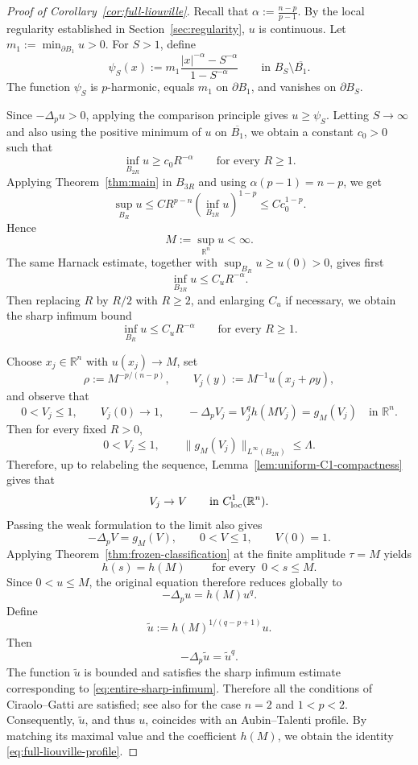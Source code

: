 \documentclass[reqno,12pt]{amsart}
\numberwithin{equation}{section}
\theoremstyle{remark}
\newcommand{\R}{\mathbb R}
\begin{document}
\begin{proof}[Proof of Corollary~\ref{cor:full-liouville}]
Recall that $ \alpha:=\frac{n-p}{p-1}.$
By the local regularity established in
Section~\ref{sec:regularity}, $u$ is continuous.  Let
$m_1:=\min_{\partial B_1}u>0$.  For $S>1$, define
$$
 \psi_S(x):=
 m_1\frac{|x|^{-\alpha}-S^{-\alpha}}{1-S^{-\alpha}}
 \qquad\text{in }B_S\setminus\overline{B_1}.
$$
The function $\psi_S$ is $p$-harmonic, equals $m_1$ on $\partial B_1$, and vanishes on $\partial B_S$.  

Since $-\Delta_p u>0$, applying the comparison principle gives
$u\ge\psi_S$.  Letting $S\to\infty$ and also using the positive minimum of $u$ on $\overline{B_1}$, we obtain a constant $c_0>0$ such that
\begin{equation}\label{eq:entire-lower-bound}
 \inf_{B_{2R}}u\ge c_0R^{-\alpha}  \qquad\text{for every }R\ge1.
\end{equation}
Applying Theorem~\ref{thm:main} in $B_{3R}$ and using
$\alpha(p-1)=n-p$, we get
$$
 \sup_{B_R}u \le C R^{p-n}\left(\inf_{B_{2R}}u\right)^{1-p}
 \le Cc_0^{1-p}.
$$
Hence
$$
 M:=\sup_{\R^n}u<\infty.
$$
The same Harnack estimate, together with $\sup_{B_R}u\ge u(0)>0$, gives first
$$
\inf_{B_{2R}}u\le C_uR^{-\alpha}.
$$
Then replacing $R$ by $R/2$ with $R\ge2$, and enlarging $C_u$ if necessary, we obtain the sharp infimum bound  
\begin{equation}\label{eq:entire-sharp-infimum}
 \inf_{B_R}u\le C_u R^{-\alpha}  \qquad\text{for every }R\ge1.
\end{equation}

Choose $x_j\in\R^n$ with $u(x_j)\to M$, set
$$
 \rho:=M^{-p/(n-p)}, \qquad V_j(y):=M^{-1}u(x_j+\rho y),
$$
and observe that
$$
 0<V_j\le1,  \qquad V_j(0)\to1,
 \qquad  -\Delta_pV_j=V_j^qh(MV_j)=g_M(V_j)
 \quad\text{in }\R^n.
 $$
Then for every fixed $R>0$,
$$
0<V_j\le1, \qquad \|g_M(V_j)\|_{L^\infty(B_{2R})}\le\Lambda.
$$
Therefore, up to relabeling the sequence,  Lemma~\ref{lem:uniform-C1-compactness}  
gives that
$$
V_j\to V\qquad\text{in }C^1_{\rm loc}(\R^n).
$$
Passing the weak formulation to the limit also gives
$$
-\Delta_pV=g_M(V), \qquad 0<V\le1, \qquad V(0)=1. 
$$  Applying
Theorem~\ref{thm:frozen-classification} at the finite amplitude $\tau=M$ yields
$$
 h(s)=h(M)\qquad \text{ for every } \ 0<s\le M.
$$
Since $0<u\le M$, the original equation therefore reduces globally to
$$
 -\Delta_pu=h(M)u^q.
$$
Define
$$
\widetilde u:=h(M)^{1/(q-p+1)}u.
$$
Then
$$
-\Delta_p\widetilde u=\widetilde u^q.
$$ 
The function $\widetilde u$ is bounded and satisfies the sharp infimum estimate corresponding to \eqref{eq:entire-sharp-infimum}.  Therefore all the conditions of
Ciraolo--Gatti \cite[Theorem~1.2]{CG2026} are satisfied; see also  \cite[Theorem~1.1]{O2025} for the case $n=2$ and $1<p<2$.
Consequently, $\widetilde u$, and thus $u$, coincides with an Aubin–Talenti profile. By matching its maximal value and the coefficient $h(M)$, we obtain the identity \eqref{eq:full-liouville-profile}.
\end{proof}
\end{document}
